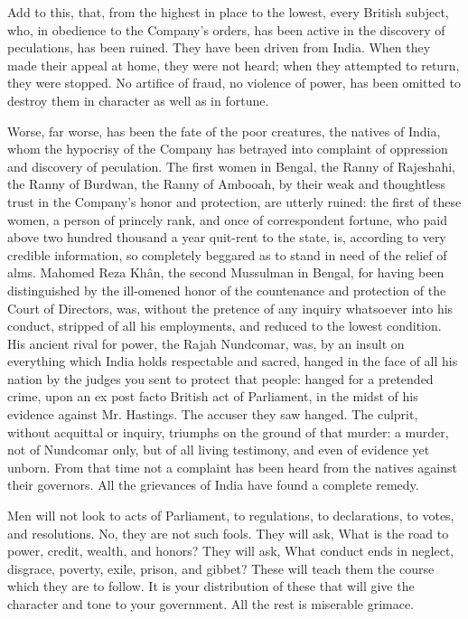 Add to this, that, from the highest in place to the lowest, every British subject, who, in obedience to the Company's orders, has been active in the discovery of peculations, has been ruined. They have been driven from India. When they made their appeal at home, they were not heard; when they attempted to return, they were stopped. No artifice of fraud, no violence of power, has been omitted to destroy them in character as well as in fortune.

Worse, far worse, has been the fate of the poor creatures, the natives of India, whom the hypocrisy of the Company has betrayed into complaint of oppression and discovery of peculation. The first women in Bengal, the Ranny of Rajeshahi, the Ranny of Burdwan, the Ranny of Ambooah, by their weak and thoughtless trust in the Company's honor and protection, are utterly ruined: the first of these women, a person of princely rank, and once of correspondent fortune, who paid above two hundred thousand a year quit-rent to the state, is, according to very credible information, so completely beggared as to stand in need of the relief of alms. Mahomed Reza Khân, the second Mussulman in Bengal, for having been distinguished by the ill-omened honor of the countenance and protection of the Court of Directors, was, without the pretence of any inquiry whatsoever into his conduct, stripped of all his employments, and reduced to the lowest condition. His ancient rival for power, the Rajah Nundcomar, was, by an insult on everything which India holds respectable and sacred, hanged in the face of all his nation by the judges you sent to protect that people: hanged for a pretended crime, upon an ex post facto British act of Parliament, in the midst of his evidence against Mr. Hastings. The accuser they saw hanged. The culprit, without acquittal or inquiry, triumphs on the ground of that murder: a murder, not of Nundcomar only, but of all living testimony, and even of evidence yet unborn. From that time not a complaint has been heard from the natives against their governors. All the grievances of India have found a complete remedy.

Men will not look to acts of Parliament, to regulations, to declarations, to votes, and resolutions. No, they are not such fools. They will ask, What is the road to power, credit, wealth, and honors? They will ask, What conduct ends in neglect, disgrace, poverty, exile, prison, and gibbet? These will teach them the course which they are to follow. It is your distribution of these that will give the character and tone to your government. All the rest is miserable grimace.

